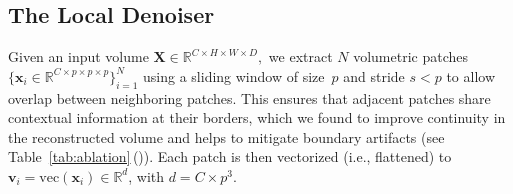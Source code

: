\subsection{The Local Denoiser}
\label{m1}
Given an input volume $\boldsymbol{X} \!\in\! \mathbb{R}^{C\times H\times W\times D},$
we extract $N$ volumetric patches $\{\boldsymbol{x}_i\!\in\!\mathbb{R}^{C\times p\times p\times p}\}_{i=1}^N$ using a sliding window of size~$p$ and stride \(s<p\) to allow overlap between neighboring patches. This ensures that adjacent patches share contextual information at their borders, which we found to improve continuity in the reconstructed volume and helps to mitigate boundary artifacts (see Table~\ref{tab:ablation}\,()). Each patch is then vectorized (i.e., flattened) to $\boldsymbol{v}_i = \mathrm{vec}(\boldsymbol{x}_i)\!\in\!\mathbb{R}^d$, with $d=C \times p^3$.


